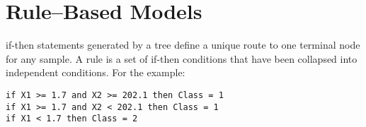 \documentclass[caret-main.tex]{subfiles}
\begin{document}



\section{Rule–Based Models}
if-then statements generated by a tree deﬁne a unique route to one
terminal node for any sample.
A rule is a set of if-then conditions that have been collapsed into
independent conditions.
For the example:
\begin{verbatim}
if X1 >= 1.7 and X2 >= 202.1 then Class = 1
if X1 >= 1.7 and X2 < 202.1 then Class = 1
if X1 < 1.7 then Class = 2
\end{verbatim}
\end{document}
